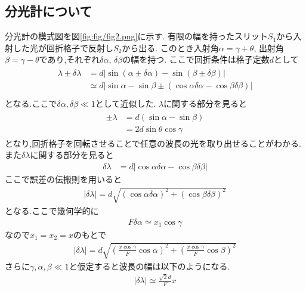 \subsection{分光計について}
分光計の模式図を図\ref{fig:fig/fig2.png}に示す.
有限の幅を持ったスリット$S_1$から入射した光が回折格子で反射し$S_2$から出る.
このとき入射角$\alpha=\gamma+\theta$, 出射角$\beta=\gamma-\theta$であり,それぞれ$\delta\alpha$, $\delta\beta$の幅を持つ.
ここで回折条件は格子定数$d$として
\begin{align}
  \begin{split}
    \lambda\pm\delta\lambda&=d|\sin(\alpha\pm\delta\alpha)-\sin(\beta\pm\delta\beta)|\\
    &\simeq d|\sin\alpha-\sin\beta\pm(\cos\alpha\delta\alpha-\cos\beta\delta\beta)|\\
  \end{split}
\end{align}
となる.ここで$\delta\alpha,\delta\beta\ll1$として近似した.
$\lambda$に関する部分を見ると
\begin{align}
  \begin{split}
    \pm\lambda&=d(\sin\alpha-\sin\beta)\\
    &=2d\sin\theta\cos\gamma
  \end{split}
\end{align}
となり,回折格子を回転させることで任意の波長の光を取り出せることがわかる.
また$\delta\lambda$に関する部分を見ると
\begin{align}
    \delta\lambda&=d|\cos\alpha\delta\alpha-\cos\beta\delta\beta|
\end{align}
ここで誤差の伝搬則を用いると
\begin{align}
  |\delta\lambda|=d\sqrt{(\cos\alpha\delta\alpha)^2+(\cos\beta\delta\beta)^2}
\end{align}
となる.ここで幾何学的に
\begin{align}
  F\delta\alpha\simeq x_1\cos\gamma
\end{align}
なので$x_1=x_2=x$のもとで
\begin{align}
  |\delta\lambda|=d\sqrt{\left(\frac{x\cos\gamma}{F}\cos\alpha\right)^2+\left(\frac{x\cos\gamma}{F}\cos\beta\right)^2}
\end{align}
さらに$\gamma,\alpha,\beta\ll1$と仮定すると波長の幅は以下のようになる.
\begin{align}
  |\delta\lambda|\simeq \frac{\sqrt{2}d}{F}x
\end{align}
\clearpage
{}